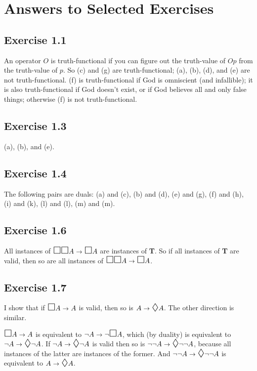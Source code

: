 \documentclass{scrartcl}
\let\oldbox\Box
\renewcommand\Box{\scaleobj{1.2}{\oldbox}}
\let\olddiamond\Diamond
\renewcommand\Diamond{\scaleobj{1.2}{\olddiamond}}
\let\oldto\to
\renewcommand\to{\scaleobj{0.95}{\,\oldto\,}}
\begin{document}
\section*{Answers to Selected Exercises}\label{ch:answers}

\subsection*{Exercise 1.1}

An operator $O$ is truth-functional if you can figure out the
truth-value of $Op$ from the truth-value of $p$. So (c) and
(g) are truth-functional; (a), (b), (d), and (e) are not
truth-functional. (f) is truth-functional if God is omniscient (and
infallible); it is also truth-functional if God doesn't exist, or if
God believes all and only false things; otherwise (f) is not
truth-functional.

\subsection*{Exercise 1.3}

(a), (b), and (e).

\subsection*{Exercise 1.4}

  The following pairs are duals: (a) and (c), (b) and (d), (e) and
  (g), (f) and (h), (i) and (k), (l) and (l), (m) and (m).

\subsection*{Exercise 1.6}

  All instances of $\Box \Box A \to \Box A$ are instances of
  \textbf{T}. So if all instances of \textbf{T} are valid, then so are
  all instances of $\Box \Box A \to \Box A$.

\subsection*{Exercise 1.7}

  I show that if $\Box A \to A$ is valid, then so is
  $A \to \Diamond A$. The other direction is similar.

  $\Box A \to A$ is equivalent to $\neg A \to \neg \Box A$, which (by
  duality) is equivalent to $\neg A \to \Diamond \neg A$. If
  $\neg A \to \Diamond \neg A$ is valid then so is
  $\neg \neg A \to \Diamond \neg \neg A$, because all instances of the
  latter are instances of the former. And
  $\neg \neg A \to \Diamond \neg \neg A$ is equivalent to
  $A \to \Diamond A$.
\end{document}
